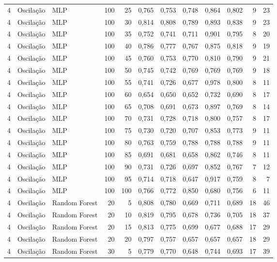 \begin{longtable}{@{}rllrrrrrrrrr@{}}
4 & Oscilação & MLP & 100 & 25 & 0,765 & 0,753 & 0,748 & 0,864 & 0,802 & 9 & 23 \\
4 & Oscilação & MLP & 100 & 30 & 0,814 & 0,808 & 0,789 & 0,893 & 0,838 & 9 & 23 \\
4 & Oscilação & MLP & 100 & 35 & 0,752 & 0,741 & 0,711 & 0,901 & 0,795 & 8 & 20 \\
4 & Oscilação & MLP & 100 & 40 & 0,786 & 0,777 & 0,767 & 0,875 & 0,818 & 9 & 19 \\
4 & Oscilação & MLP & 100 & 45 & 0,760 & 0,753 & 0,770 & 0,810 & 0,790 & 9 & 21 \\
4 & Oscilação & MLP & 100 & 50 & 0,745 & 0,742 & 0,769 & 0,769 & 0,769 & 9 & 18 \\
4 & Oscilação & MLP & 100 & 55 & 0,741 & 0,726 & 0,677 & 0,978 & 0,800 & 8 & 11 \\
4 & Oscilação & MLP & 100 & 60 & 0,654 & 0,650 & 0,652 & 0,732 & 0,690 & 8 & 17 \\
4 & Oscilação & MLP & 100 & 65 & 0,708 & 0,691 & 0,673 & 0,897 & 0,769 & 8 & 14 \\
4 & Oscilação & MLP & 100 & 70 & 0,731 & 0,728 & 0,718 & 0,800 & 0,757 & 8 & 17 \\
4 & Oscilação & MLP & 100 & 75 & 0,730 & 0,720 & 0,707 & 0,853 & 0,773 & 9 & 11 \\
4 & Oscilação & MLP & 100 & 80 & 0,763 & 0,759 & 0,788 & 0,788 & 0,788 & 9 & 11 \\
4 & Oscilação & MLP & 100 & 85 & 0,691 & 0,681 & 0,658 & 0,862 & 0,746 & 8 & 11 \\
4 & Oscilação & MLP & 100 & 90 & 0,731 & 0,726 & 0,697 & 0,852 & 0,767 & 7 & 12 \\
4 & Oscilação & MLP & 100 & 95 & 0,714 & 0,718 & 0,647 & 0,917 & 0,759 & 8 & 7 \\
4 & Oscilação & MLP & 100 & 100 & 0,766 & 0,772 & 0,850 & 0,680 & 0,756 & 6 & 11 \\
4 & Oscilação & Random Forest & 20 & 5 & 0,808 & 0,780 & 0,669 & 0,711 & 0,689 & 18 & 46 \\
4 & Oscilação & Random Forest & 20 & 10 & 0,819 & 0,795 & 0,678 & 0,736 & 0,705 & 18 & 37 \\
4 & Oscilação & Random Forest & 20 & 15 & 0,813 & 0,775 & 0,699 & 0,677 & 0,688 & 17 & 29 \\
4 & Oscilação & Random Forest & 20 & 20 & 0,797 & 0,757 & 0,657 & 0,657 & 0,657 & 18 & 29 \\
4 & Oscilação & Random Forest & 30 & 5 & 0,779 & 0,770 & 0,648 & 0,744 & 0,693 & 17 & 39 \\

\end{longtable}
